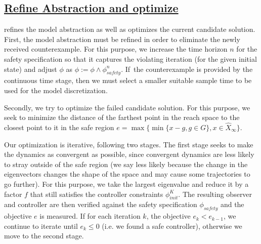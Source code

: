 \documentclass[a4paper,UKenglish]{lipics-v2018}
\renewcommand{\vec}[1]{{#1}}
\newcommand{\note}[1]{\textcolor{red}{[#1]}}
\begin{document}
\subsection*{\underline{{\sc Refine Abstraction and optimize}}} refines the
model abstraction as well as optimizes the current candidate
solution.
%
First, the model abstraction must be refined in order to eliminate
the newly received counterexample. For this purpose,
we increase the time horizon $n$ for the
safety specification so that it captures the violating iteration
(for the given initial state) and adjust $\phi$ as 
$\phi := \phi \wedge \phi_\mathit{safety}^n$.
If~the counterexample is provided by the {\sc continuous time} stage,
then we must select a smaller suitable sample time to be used
for the model discretization.


Secondly, we try to optimize the failed candidate solution.
For this purpose, we seek to minimize the distance of the farthest point in the
reach space to the closest point to it in the safe region
$%
e = \max\{\min\{\vec{x}-\vec{g}, \vec{g}\in G\}, \vec{x} \in \hat{X}_\infty \}.
$%

Our optimization is iterative, following two stages.  The first stage
seeks to make the dynamics as convergent as possible, since convergent
dynamics are less likely to stray outside of the safe region (we say
less likely because the change in the eigenvectors changes the shape
of the space and may cause some trajectories to go further). For this
purpose, we take the largest eigenvalue and reduce it by a factor $f$
that still satisfies the controller constraints $\phi_\mathit{init}^{K}$.
The resulting observer and controller are then
verified against the safety specification $\phi_\mathit{safety}$ and the
objective $e$ is measured. %
If for each iteration $k$, the objective $e_k<e_{k-1}$, we continue to
iterate until $e_k \leq 0$ (i.e. we found a safe controller),
otherwise we move to the second stage.
\end{document}
